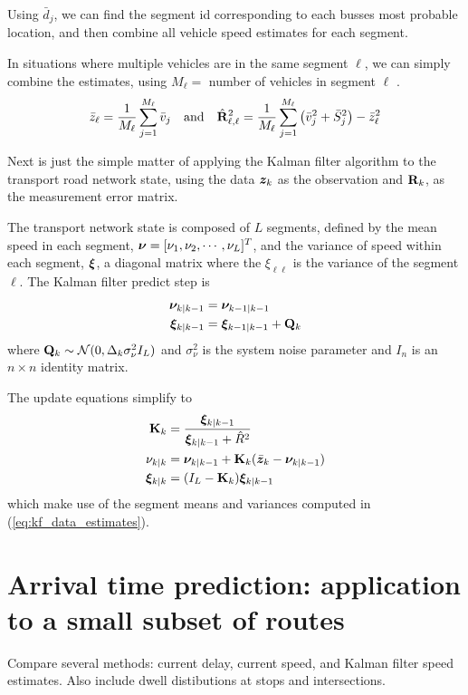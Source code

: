 \documentclass[draftcls,a4paper,onecolumn]{IEEEtran}\usepackage[]{graphicx}\usepackage[]{color}
\begin{document}
Using $\bar d_j$, we can find the segment id corresponding to each busses most probable location,
and then combine all vehicle speed estimates for each segment.

In situations where multiple vehicles are in the same segment $\ell$, 
we can simply combine the estimates, using $M_\ell = $ number of vehicles in segment $\ell$ 
\cite{cn}.
\begin{equation}
  \label{eq:kf_data_estimates}
  \bar z_\ell = \frac{1}{M_\ell} \sum_{j = 1}^{M_\ell} \bar v_j \quad\text{and}\quad
  \hat {\mathbf{R}}_{\ell,\ell}^2 = \frac{1}{M_\ell} \sum_{j=1}^{M_\ell} \left(\bar v_j^2 + \bar S_j^2\right) - \bar z_\ell^2
\end{equation}

Next is just the simple matter of applying the Kalman filter algorithm to the transport road network state,
using the data $\boldsymbol{z}_k$ as the observation and $\mathbf{R}_k$,
as the measurement error matrix.

The transport network state is composed of $L$ segments,
defined by the mean speed in each segment, 
\mbox{$\boldsymbol{\nu} = [\nu_1, \nu_2, \cdots, \nu_L]^T$},
and the variance of speed within each segment, $\boldsymbol{\xi}$, 
a diagonal matrix where the $\xi_{\ell\ell}$ is the variance of the segment $\ell$.
The Kalman filter predict step is
\begin{align}
  \boldsymbol{\nu}_{k|k-1} &= \boldsymbol{\nu}_{k-1|k-1} \\
  \boldsymbol{\xi}_{k|k-1} &= \boldsymbol{\xi}_{k-1|k-1} + \mathbf{Q}_k
\end{align}
where $\mathbf{Q}_k \sim \mathcal{N}(0, \Delta_k\sigma_{\nu}^2I_L)$ and $\sigma_{\nu}^2$ is the system noise parameter
and $I_n$ is an $n\times n$ identity matrix.

The update equations simplify to
\begin{align}
  \mathbf{K}_k &= \frac{\boldsymbol{\xi}_{k|k-1}}{\boldsymbol{\xi}_{k|k-1} + \hat R^2} \\
  \nu_{k|k} &= \boldsymbol{\nu}_{k|k-1} + \mathbf{K}_k(\bar{\boldsymbol{z}}_k - \boldsymbol{\nu}_{k|k-1}) \\
  \boldsymbol{\xi}_{k|k} &= (I_L - \mathbf{K}_k) \boldsymbol{\xi}_{k|k-1}
\end{align}
which make use of the segment means and variances computed in (\ref{eq:kf_data_estimates}).


\section{Arrival time prediction: application to a small subset of routes}
\label{sec:results}


Compare several methods:
current delay, current speed, and Kalman filter speed estimates.
Also include dwell distibutions at stops and intersections.
\end{document}
